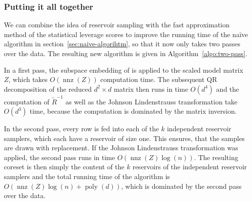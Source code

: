 \subsubsection{Putting it all together}

We can combine the idea of reservoir sampling with the fast approximation
method of the statistical leverage scores to improve
the running time of the na\"ive algorithm
in section~\ref{sec:naive-algorihtm}, so that it now only takes two
passes over the data. The resulting new algorithm is
given in Algorithm~\ref{algo:two-pass}.

In a first pass, the subspace embedding of \cite{woodruff-2017}
is applied to the scaled model matrix $Z$, which takes
$O(\operatorname{nnz}(Z))$ computation time. The subsequent
QR decomposition of the reduced $d^2 \times d$ matrix then runs
in time $O(d^4)$ and the computation of $\tilde{R}^{-1}$
as well as the Johnson Lindenstrauss transformation take
$O(d^3)$ time, because the computation is dominated by the
matrix inversion.

In the second pass, every row is fed into each of the
$k$ independent reservoir samplers, which each have a reservoir
of size one. This ensures, that the samples are drawn
with replacement. If the Johnson Lindenstrauss transformation
was applied, the second pass runs in time
$O(\operatorname{nnz}(Z) \log(n))$.
The resulting coreset is then simply the content of the
$k$ reservoirs of the independent reservoir samplers
and the total running time of the algorithm is
$O(\operatorname{nnz}(Z) \log(n) + \operatorname{poly}(d))$,
which is dominated by the second pass over the data.

